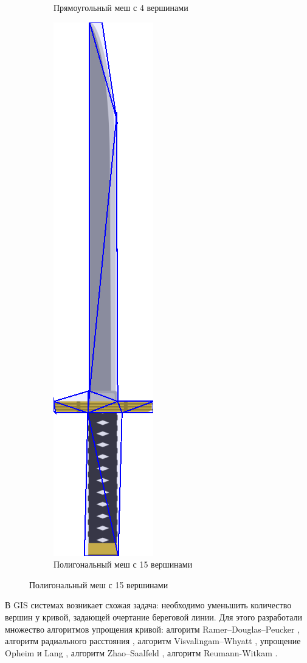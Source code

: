 \documentclass{fefu_thesis/cls/fefu}
\begin{document}
\begin{figure}[H]
\begin{subfigure}[c]{.49\linewidth}
            \caption{Прямоугольный меш с 4 вершинами}
        \end{subfigure}
        \begin{subfigure}[c]{.49\linewidth}
            \centering
            \includegraphics{images/katana_15v.png}
            \caption{Полигональный меш с 15 вершинами}
        \end{subfigure}
    \end{figure}

    В GIS системах возникает схожая задача: необходимо уменьшить количество вершин у кривой, задающей очертание береговой линии. Для этого разработали множество алгоритмов упрощения кривой: алгоритм Ramer–Douglas–Peucker \cite{Ramer}\cite{DouglasPeucker}, алгоритм радиального расстояния \cite{PolylineSimplification}, алгоритм Visvalingam–Whyatt \cite{VisvalingamWhyatt}, упрощение Opheim \cite{Opheim} и Lang \cite{Lang}, алгоритм Zhao–Saalfeld \cite{ZhaoSaalfeld}, алгоритм Reumann-Witkam \cite{ReumannWitkam}.
\end{document}
